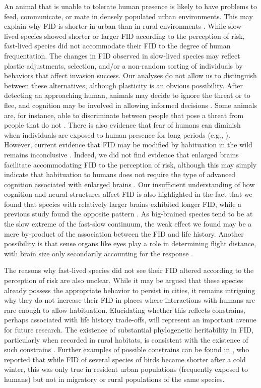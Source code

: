 An animal that is unable to tolerate human presence is likely
to have problems to feed, communicate, or mate in densely
populated urban environments. This may explain why FID is
shorter in urban than in rural environments \citep{Moller2010, Moller2015a}. 
While slow-lived species showed shorter
or larger FID according to the perception of risk, fast-lived
species did not accommodate their FID to the degree of human
frequentation. The changes in FID observed in slow-lived species
may reflect plastic adjustments, selection, and/or a non-random 
sorting of individuals by behaviors that affect invasion
success. Our analyses do not allow us to distinguish between
these alternatives, although plasticity is an obvious possibility.
After detecting an approaching human, animals may decide to
ignore the threat or to flee, and cognition may be involved in
allowing informed decisions \citep{Moller2014a}. Some
animals are, for instance, able to discriminate between people
that pose a threat from people that do not \citep{Levey2009, Lee2011}. 
There is also evidence that fear of humans can
diminish when individuals are exposed to human presence for
long periods (e.g., \citet{Perals2017}). However, current
evidence that FID may be modified by habituation in the wild
remains inconclusive \citep{Moller2015}. Indeed, we did not find
evidence that enlarged brains facilitate accommodating FID to
the perception of risk, although this may simply indicate that
habituation to humans does not require the type of advanced
cognition associated with enlarged brains \citep{Overington2009}. 
Our insufficient understanding of how cognition and
neural structures affect FID is also highlighted in the fact that
we found that species with relatively larger brains exhibited
longer FID, while a previous study found the opposite pattern
\citep{Moller2014a}. As big-brained species tend to be
at the slow extreme of the fast-slow continuum, the weak effect
we found may be a mere by-product of the association between
the FID and life history. Another possibility is that sense organs
like eyes play a role in determining flight distance, with brain
size only secondarily accounting for the response \citep{Moller2014a}.

The reasons why fast-lived species did not see their FID
altered according to the perception of risk are also unclear.
While it may be argued that these species already possess
the appropriate behavior to persist in cities, it remains intriguing
why they do not increase their FID in places where interactions
with humans are rare enough to allow habituation.
Elucidating whether this reflects constrains, perhaps associated
with life history trade-offs, will represent an important avenue
for future research. The existence of substantial phylogenetic
heritability in FID, particularly when recorded in rural
habitats, is consistent with the existence of such constrains
\citep{Blomberg2003}. Further examples of possible
constrains can be found in \citet{Moller2013}, who reported that
while FID of several species of birds became shorter after a
cold winter, this was only true in resident urban populations
(frequently exposed to humans) but not in migratory or rural
populations of the same species.

